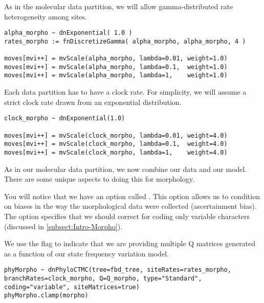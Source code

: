 As in the molecular data partition, we will allow gamma-distributed rate heterogeneity among sites.
{\tt \begin{snugshade*}
\begin{lstlisting}
alpha_morpho ~ dnExponential( 1.0 )
rates_morpho := fnDiscretizeGamma( alpha_morpho, alpha_morpho, 4 )

moves[mvi++] = mvScale(alpha_morpho, lambda=0.01, weight=1.0)
moves[mvi++] = mvScale(alpha_morpho, lambda=0.1,  weight=1.0)
moves[mvi++] = mvScale(alpha_morpho, lambda=1,    weight=1.0)
\end{lstlisting}
\end{snugshade*}}

Each data partition has to have a clock rate. For simplicity, we will assume a strict clock rate drawn from an exponential distribution.

{\tt \begin{snugshade*}
\begin{lstlisting}
clock_morpho ~ dnExponential(1.0)

moves[mvi++] = mvScale(clock_morpho, lambda=0.01, weight=4.0)
moves[mvi++] = mvScale(clock_morpho, lambda=0.1,  weight=4.0)
moves[mvi++] = mvScale(clock_morpho, lambda=1,    weight=4.0)
\end{lstlisting}
\end{snugshade*}}

As in our molecular data partition, we now combine our data and our model. There are some unique aspects to doing this for morphology. \par
You will notice that we have an option called . This option allows us to condition on biases in the way the morphological data were collected (ascertainment bias).
The option  specifies that we should correct for coding only variable characters (discussed in \ref{subsect:Intro-Morpho}). \par

We use the flag  to indicate that we are providing multiple Q matrices generated as a function of our state frequency variation model. \par


{\tt \begin{snugshade*}
\begin{lstlisting}
phyMorpho ~ dnPhyloCTMC(tree=fbd_tree, siteRates=rates_morpho, branchRates=clock_morpho, Q=Q_morpho, type="Standard", coding="variable", siteMatrices=true)
phyMorpho.clamp(morpho)
\end{lstlisting}
\end{snugshade*}}


